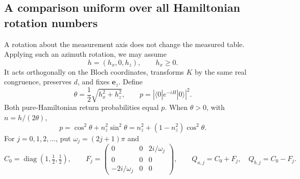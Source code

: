 \documentclass[11pt]{article}
\theoremstyle{definition}
\theoremstyle{remark}
\DeclareMathOperator{\diag}{diag}
\newcommand{\ee}{\mathbf e_z}
\begin{document}
\subsection{A comparison uniform over all Hamiltonian rotation numbers}
A rotation about the measurement axis does not change the measured table. Applying such an azimuth rotation, we may assume
\begin{equation}\label{eq:azimuth}
 h=(h_x,0,h_z),\qquad h_x\geq0.
\end{equation}
It acts orthogonally on the Bloch coordinates, transforms \(K\) by the same real congruence, preserves \(d\), and fixes \(\ee\). Define
\[
 \theta=\frac12\sqrt{h_x^2+h_z^2},\qquad
 p=\left|\langle0|e^{-iH}|0\rangle\right|^2.
\]
Both pure-Hamiltonian return probabilities equal \(p\). When \(\theta>0\), with \(n=h/(2\theta)\),
\begin{equation}\label{eq:unitary-p}
 p=\cos^2\theta+n_z^2\sin^2\theta
 =n_z^2+(1-n_z^2)\cos^2\theta.
\end{equation}
For \(j=0,1,2,\ldots\), put \(\omega_j=(2j+1)\pi\) and
\begin{equation}\label{eq:QaQb}
 C_0=\diag(1,\tfrac12,\tfrac12),\qquad
 F_j=\begin{pmatrix}0&0&2i/\omega_j\\0&0&0\\-2i/\omega_j&0&0\end{pmatrix},
 \qquad Q_{a,j}=C_0+F_j,\quad Q_{b,j}=C_0-F_j.
\end{equation}
\end{document}
